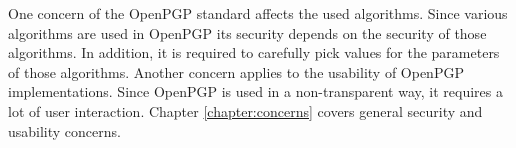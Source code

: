 One concern of the OpenPGP standard affects the used algorithms. Since various algorithms are used in OpenPGP its security depends on the security of those algorithms. In addition, it is required to carefully pick values for the parameters of those algorithms. Another concern applies to the usability of OpenPGP implementations. Since OpenPGP is used in a non-transparent way, it requires a lot of user interaction.
Chapter \ref{chapter:concerns} covers general security and usability concerns.

%
%
%
%
%
%
%
%
%
